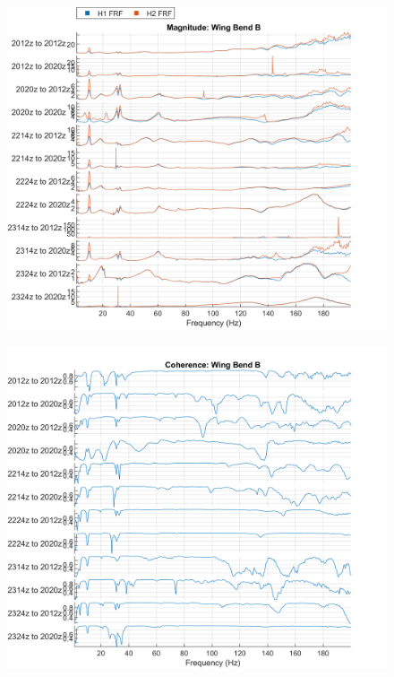 \begin{figure}[H]
    \centering
    \includegraphics{figs/GVT/mag_Wing Bend B.png}
    \label{fig:mag_wingBendB}
\end{figure}
\begin{figure}[H]
    \centering
    \includegraphics{figs/GVT/coh_Wing Bend B.png}
    \label{fig:coh_wingBendB}
\end{figure}

